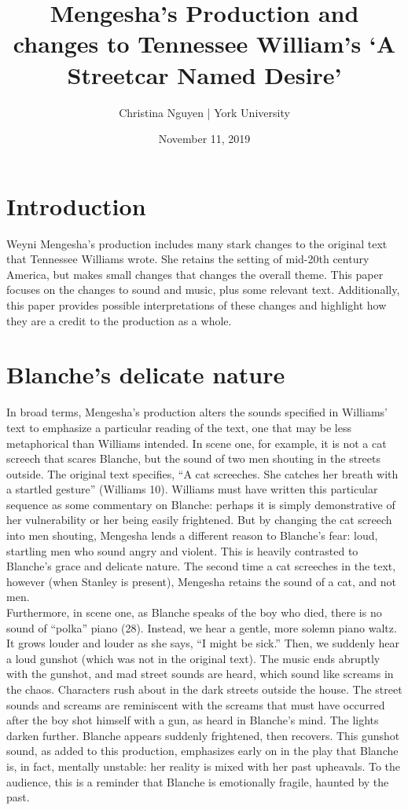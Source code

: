 \documentclass{article}
\title{Mengesha's Production and changes to Tennessee William's `A Streetcar Named Desire'}
\author{Christina Nguyen | York University }
\date{November 11, 2019}
\begin{document}
\maketitle


\section{Introduction} 

\qquad Weyni Mengesha’s production includes many stark changes to the original text that Tennessee Williams wrote. She retains the setting of mid-20th century America, but makes small changes that changes the overall theme. This paper focuses on the changes to sound and music, plus some relevant text. Additionally, this paper provides possible interpretations of these changes and highlight how they are a credit to the production as a whole.\\

\section{Blanche's delicate nature}

\qquad In broad terms, Mengesha’s production alters the sounds specified in Williams’ text to emphasize a particular reading of the text, one that may be less metaphorical than Williams intended. In scene one, for example, it is not a cat screech that scares Blanche, but the sound of two men shouting in the streets outside. The original text specifies, ``A cat screeches. She catches her breath with a startled gesture” (Williams 10). Williams must have written this particular sequence as some commentary on Blanche: perhaps it is simply demonstrative of her vulnerability or her being easily frightened. But by changing the cat screech into men shouting, Mengesha lends a different reason to Blanche’s fear: loud, startling men who sound angry and violent. This is heavily contrasted to Blanche's grace and delicate nature. The second time a cat screeches in the text, however (when Stanley is present), Mengesha retains the sound of a cat, and not men.  \\

Furthermore, in scene one, as Blanche speaks of the boy who died, there is no sound of ``polka” piano (28). Instead, we hear a gentle, more solemn piano waltz. It grows louder and louder as she says, ``I might be sick.” Then, we suddenly hear a loud gunshot (which was not in the original text). The music ends abruptly with the gunshot, and mad street sounds are heard, which sound like screams in the chaos. Characters rush about in the dark streets outside the house. The street sounds and screams are reminiscent with the screams that must have occurred after the boy shot himself with a gun, as heard in Blanche’s mind. The lights darken further. Blanche appears suddenly frightened, then recovers. This gunshot sound, as added to this production, emphasizes early on in the play that Blanche is, in fact, mentally unstable: her reality is mixed with her past upheavals. To the audience, this is a reminder that Blanche is emotionally fragile, haunted by the past. \\
\end{document}
